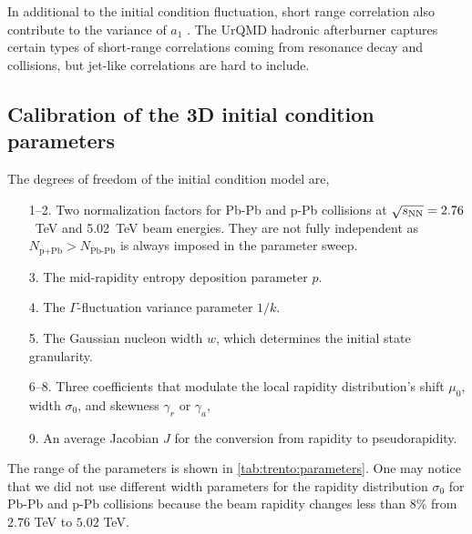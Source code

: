 In additional to the initial condition fluctuation, short range correlation also contribute to the variance of $a_1$ \cite{Denicol:2015bnf}.
The UrQMD hadronic afterburner captures certain types of short-range correlations coming from resonance decay and collisions, but jet-like correlations are hard to include.

\subsection{Calibration of the 3D initial condition parameters}
The degrees of freedom of the initial condition model are,
\begin{itemize}[itemsep=0pt]
  \item[1--2.] Two normalization factors for Pb-Pb and p-Pb collisions at $\sqrt{s_\mathrm{NN}}=2.76$~TeV and 5.02~TeV beam energies. They are not fully independent as $N_{\textrm{p+Pb}} > N_{\textrm{Pb-Pb}}$ is always imposed in the parameter sweep.
  \item[3.] The mid-rapidity entropy deposition parameter $p$.
  \item[4.] The $\Gamma$-fluctuation variance parameter $1/k$.
  \item[5.] The Gaussian nucleon width $w$, which determines the initial state granularity.
  \item[6--8.] Three coefficients that modulate the local rapidity distribution's shift $\mu_0$, width $\sigma_0$, and skewness $\gamma_r$ or $\gamma_a$,
  \item[9.] An average Jacobian $J$ for the conversion from rapidity to pseudorapidity.
\end{itemize}
The range of the parameters is shown in \ref{tab:trento:parameters}.
One may notice that we did not use different width parameters for the rapidity distribution $\sigma_0$ for Pb-Pb and p-Pb collisions because the beam rapidity changes less than $8\%$ from $2.76$ TeV to $5.02$ TeV.

